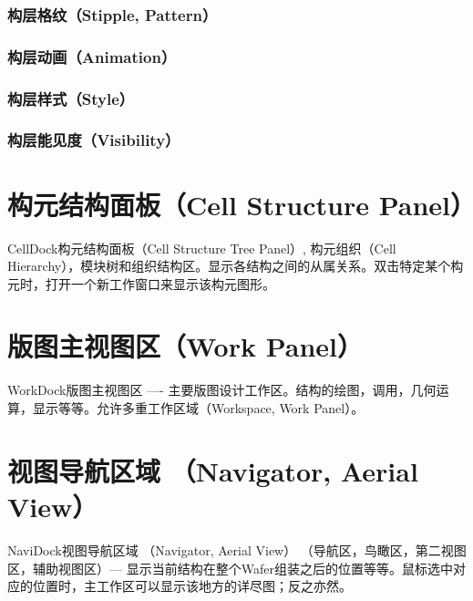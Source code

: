 \subsubsection{构层格纹（Stipple, Pattern）}
\subsubsection{构层动画（Animation）}
\subsubsection{构层样式（Style）}
\subsubsection{构层能见度（Visibility）}

\section{构元结构面板（Cell Structure Panel）} \label{SectMaskCellDock}
CellDock构元结构面板（Cell Structure Tree Panel）, 构元组织（Cell Hierarchy），模块树和组织结构区。显示各结构之间的从属关系。双击特定某个构元时，打开一个新工作窗口来显示该构元图形。

\section{版图主视图区（Work Panel）} \label{SectMaskWorkDock}
WorkDock版图主视图区 ---- 主要版图设计工作区。结构的绘图，调用，几何运算，显示等等。允许多重工作区域（Workspace, Work Panel）。

\section{视图导航区域 （Navigator, Aerial View）} \label{SectMaskNaviDock}
NaviDock视图导航区域 （Navigator, Aerial View） （导航区，鸟瞰区，第二视图区，辅助视图区）--- 显示当前结构在整个Wafer组装之后的位置等等。鼠标选中对应的位置时，主工作区可以显示该地方的详尽图；反之亦然。

